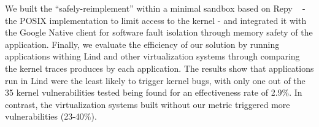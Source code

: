 We built the  ``safely-reimplement'' within a minimal sandbox based on Repy ~\cite{Repy-10} - the POSIX implementation 
to limit access to the kernel - and  integrated it with the Google Native client for software fault isolation through memory safety of the application. 
Finally, we evaluate the efficiency of our solution by running applications withing Lind and other virtualization systems 
through comparing the kernel traces produces by each application. 
The results show that applications run in Lind were the least likely to trigger kernel bugs, 
with only one out of the 35 kernel vulnerabilities tested being found for an effectiveness rate of 2.9\%. 
In contrast, the virtualization systems built without our metric triggered more vulnerabilities (23-40\%).  


